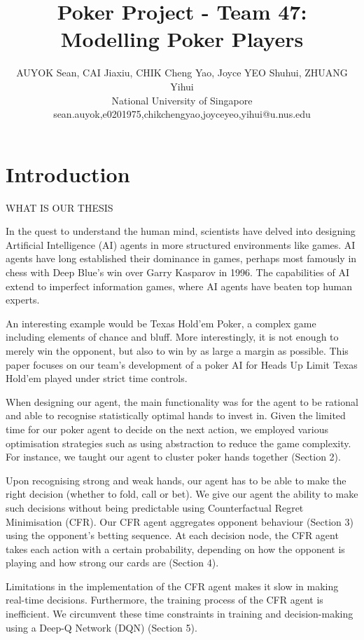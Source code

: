 \documentclass{article}
\title{Poker Project - Team 47: Modelling Poker Players}
\author{
AUYOK Sean, CAI Jiaxiu, CHIK Cheng Yao, Joyce YEO Shuhui, ZHUANG Yihui
\\ 
National University of Singapore\\
sean.auyok,e0201975,chikchengyao,joyceyeo,yihui@u.nus.edu
}
\begin{document}
\maketitle

\section{Introduction}

WHAT IS OUR THESIS

In the quest to understand the human mind, scientists have delved into designing Artificial Intelligence (AI) agents in more structured environments like games. AI agents have long established their dominance in games, perhaps most famously in chess with Deep Blue's win over Garry Kasparov in 1996. The capabilities of AI extend to imperfect information games, where AI agents have beaten top human experts. 

An interesting example would be Texas Hold'em Poker, a complex game including elements of chance and bluff. More interestingly, it is not enough to merely win the opponent, but also to win by as large a margin as possible. This paper focuses on our team's development of a poker AI for Heads Up Limit Texas Hold'em played under strict time controls. 

When designing our agent, the main functionality was for the agent to be rational and able to recognise statistically optimal hands to invest in. Given the limited time for our poker agent to decide on the next action, we employed various optimisation strategies such as using abstraction to reduce the game complexity. For instance, we taught our agent to cluster poker hands together (Section 2).

Upon recognising strong and weak hands, our agent has to be able to make the right decision (whether to fold, call or bet). We give our agent the ability to make such decisions without being predictable using Counterfactual Regret Minimisation (CFR). Our CFR agent aggregates opponent behaviour (Section 3) using the opponent's betting sequence. At each decision node, the CFR agent takes each action with a certain probability, depending on how the opponent is playing and how strong our cards are (Section 4).

Limitations in the implementation of the CFR agent makes it slow in making real-time decisions. Furthermore, the training process of the CFR agent is inefficient. We circumvent these time constraints in training and decision-making using a Deep-Q Network (DQN) (Section 5). 
\end{document}

